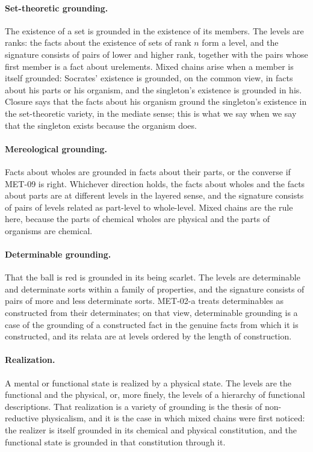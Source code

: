 \documentclass{situationist-preprint}
\begin{document}
\paragraph{Set-theoretic grounding.} The existence of a set is grounded in the existence of its members. The levels are ranks: the facts about the existence of sets of rank $n$ form a level, and the signature consists of pairs of lower and higher rank, together with the pairs whose first member is a fact about urelements. Mixed chains arise when a member is itself grounded: Socrates' existence is grounded, on the common view, in facts about his parts or his organism, and the singleton's existence is grounded in his. Closure says that the facts about his organism ground the singleton's existence in the set-theoretic variety, in the mediate sense; this is what we say when we say that the singleton exists because the organism does.

\paragraph{Mereological grounding.} Facts about wholes are grounded in facts about their parts, or the converse if MET-09 is right. Whichever direction holds, the facts about wholes and the facts about parts are at different levels in the layered sense, and the signature consists of pairs of levels related as part-level to whole-level. Mixed chains are the rule here, because the parts of chemical wholes are physical and the parts of organisms are chemical.

\paragraph{Determinable grounding.} That the ball is red is grounded in its being scarlet. The levels are determinable and determinate sorts within a family of properties, and the signature consists of pairs of more and less determinate sorts. MET-02-a treats determinables as constructed from their determinates; on that view, determinable grounding is a case of the grounding of a constructed fact in the genuine facts from which it is constructed, and its relata are at levels ordered by the length of construction.

\paragraph{Realization.} A mental or functional state is realized by a physical state. The levels are the functional and the physical, or, more finely, the levels of a hierarchy of functional descriptions. That realization is a variety of grounding is the thesis of non-reductive physicalism, and it is the case in which mixed chains were first noticed: the realizer is itself grounded in its chemical and physical constitution, and the functional state is grounded in that constitution through it.
\end{document}
